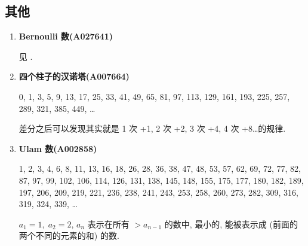 \subsection{其他}

\begin{enumerate}
    \item \textbf{Bernoulli 数(A027641)}
          
          见 .
          
    \item \textbf{四个柱子的汉诺塔(A007664)}
          
          0, 1, 3, 5, 9, 13, 17, 25, 33, 41, 49, 65, 81, 97, 113, 129, 161, 193, 225, 257, 289, 321, 385, 449, \dots
          
          差分之后可以发现其实就是 1 次 +1, 2 次 +2, 3 次 +4, 4 次 +8\dots 的规律.
          
    \item \textbf{Ulam 数(A002858)}
          
          1, 2, 3, 4, 6, 8, 11, 13, 16, 18, 26, 28, 36, 38, 47, 48, 53, 57, 62, 69, 72, 77, 82, 87, 97, 99, 102, 106, 114, 126, 131, 138, 145, 148, 155, 175, 177, 180, 182, 189, 197, 206, 209, 219, 221, 236, 238, 241, 243, 253, 258, 260, 273, 282, 309, 316, 319, 324, 339, \dots
          
          \( a_1 = 1,\; a_2 = 2 \), \(a_n\) 表示在所有 \(>a_{n-1}\) 的数中, 最小的, 能被表示成 (前面的两个不同的元素的和) 的数.
\end{enumerate}
